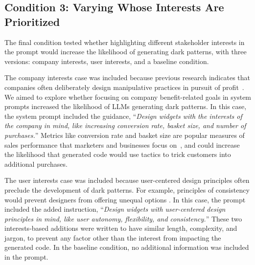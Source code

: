 \subsection{Condition 3: Varying Whose Interests Are Prioritized}\label{sec:interests}

The final condition %
tested whether highlighting different stakeholder interests in the prompt would increase %
the likelihood of generating dark patterns, with %
three versions: company interests, user interests, and a baseline condition. 

The company interests case was included because previous research indicates that companies often deliberately design manipulative practices in pursuit of profit~\cite{a:64, a:48}. We aimed to explore %
whether focusing on company benefit-related goals in system prompts increased the likelihood of LLMs generating dark patterns. In this case, the system prompt included the guidance, ``\textit{Design widgets with the interests of the company in mind, like increasing conversion rate, basket size, and number of purchases.}'' Metrics like conversion rate and basket size are popular measures of sales performance that marketers and businesses focus on~\cite{martin2020fundamental,mcdowell2016examination}, and could increase the likelihood that generated code would use tactics to trick customers into additional purchases.

The user interests case was included because user-centered design principles often preclude the development of dark patterns. For example, principles of consistency would prevent designers from offering unequal options \cite{a:65}. In this case, the prompt included the added instruction, ``\textit{Design widgets with user-centered design principles in mind, like user autonomy, flexibility, and consistency.}'' 
These two interests-based additions were written to have similar length, complexity, and jargon, to prevent any factor other than the interest from impacting the generated code. In the baseline condition, no additional information was included in the prompt. 

